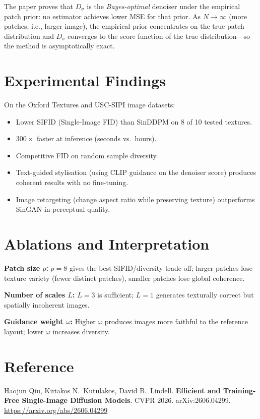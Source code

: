 \documentclass[10pt,twocolumn]{article}
\begin{document}
The paper proves that $D_\sigma$ is the \emph{Bayes-optimal} denoiser under
the empirical patch prior: no estimator achieves lower MSE for that prior.
As $N\to\infty$ (more patches, i.e., larger image), the empirical prior
concentrates on the true patch distribution and $D_\sigma$ converges to
the score function of the true distribution---so the method is
asymptotically exact.

\section{Experimental Findings}

On the Oxford Textures and USC-SIPI image datasets:
\begin{itemize}[itemsep=2pt,parsep=0pt]
  \item Lower SIFID (Single-Image FID) than SinDDPM on
    8 of 10 tested textures.
  \item $300\times$ faster at inference (seconds vs.\ hours).
  \item Competitive FID on random sample diversity.
  \item Text-guided stylisation (using CLIP guidance on the denoiser score)
    produces coherent results with no fine-tuning.
  \item Image retargeting (change aspect ratio while preserving texture)
    outperforms SinGAN in perceptual quality.
\end{itemize}

\section{Ablations and Interpretation}

\textbf{Patch size $p$:} $p=8$ gives the best SIFID/diversity trade-off;
larger patches lose texture variety (fewer distinct patches), smaller
patches lose global coherence.

\textbf{Number of scales $L$:} $L=3$ is sufficient; $L=1$ generates
texturally correct but spatially incoherent images.

\textbf{Guidance weight $\omega$:} Higher $\omega$ produces images more
faithful to the reference layout; lower $\omega$ increases diversity.

\section*{Reference}

Haojun Qiu, Kiriakos N.\ Kutulakos, David B.\ Lindell.
\textbf{Efficient and Training-Free Single-Image Diffusion Models}.
CVPR 2026. arXiv:2606.04299.
\url{https://arxiv.org/abs/2606.04299}
\end{document}
